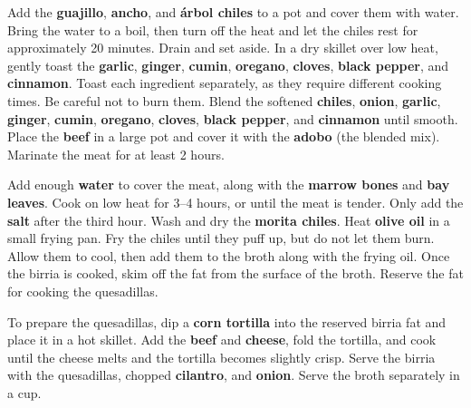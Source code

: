 Add the \textbf{guajillo}, \textbf{ancho}, and \textbf{árbol chiles} to a pot and cover them with water. Bring the water to a boil, then turn off the heat and let the chiles rest for approximately 20 minutes. Drain and set aside.
In a dry skillet over low heat, gently toast the \textbf{garlic}, \textbf{ginger}, \textbf{cumin}, \textbf{oregano}, \textbf{cloves}, \textbf{black pepper}, and \textbf{cinnamon}. Toast each ingredient separately, as they require different cooking times. Be careful not to burn them.
Blend the softened \textbf{chiles}, \textbf{onion}, \textbf{garlic}, \textbf{ginger}, \textbf{cumin}, \textbf{oregano}, \textbf{cloves}, \textbf{black pepper}, and \textbf{cinnamon} until smooth.
Place the \textbf{beef} in a large pot and cover it with the \textbf{adobo} (the blended mix). Marinate the meat for at least 2 hours.

Add enough \textbf{water} to cover the meat, along with the \textbf{marrow bones} and \textbf{bay leaves}. Cook on low heat for 3--4 hours, or until the meat is tender. Only add the \textbf{salt} after the third hour.
Wash and dry the \textbf{morita chiles}. Heat \textbf{olive oil} in a small frying pan. Fry the chiles until they puff up, but do not let them burn. Allow them to cool, then add them to the broth along with the frying oil.
Once the birria is cooked, skim off the fat from the surface of the broth. Reserve the fat for cooking the quesadillas.

To prepare the quesadillas, dip a \textbf{corn tortilla} into the reserved birria fat and place it in a hot skillet. Add the \textbf{beef} and \textbf{cheese}, fold the tortilla, and cook until the cheese melts and the tortilla becomes slightly crisp.
Serve the birria with the quesadillas, chopped \textbf{cilantro}, and \textbf{onion}. Serve the broth separately in a cup.


\medskip